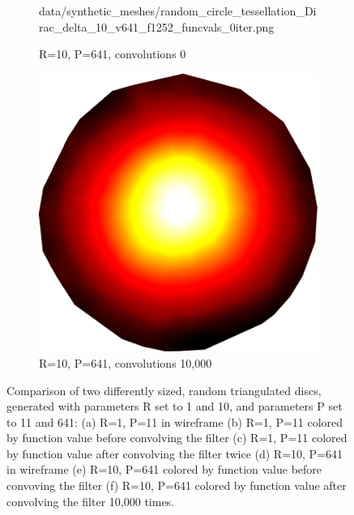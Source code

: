 \begin{figure}[ht]
\begin{subfigure}[b]{0.32\linewidth}
		{data/synthetic_meshes/random_circle_tessellation_Dirac_delta_10_v641_f1252_funcvals_0iter.png}
		\caption{R=10, P=641, convolutions 0}\label{fig:rcirc.d}
	\end{subfigure}
	\begin{subfigure}[b]{0.32\linewidth}
		\includegraphics[width=\linewidth]
		{data/synthetic_meshes/random_circle_tessellation_Dirac_delta_10_v641_f1252_funcvals_10000iter.png}
		\caption{R=10, P=641, convolutions 10,000}\label{fig:rcirc.f}
	\end{subfigure}
	\caption[Six views, comparing two differently sized, random triangulated discs]{Comparison of two differently sized, random triangulated discs, generated with parameters R set to 1 and 10, and parameters P set to 11 and 641: (a) R=1, P=11 in wireframe (b) R=1, P=11 colored by function value before convolving the filter (c) R=1, P=11 colored by function value after convolving the filter twice (d) R=10, P=641 in wireframe (e) R=10, P=641 colored by function value before convoving the filter (f) R=10, P=641 colored by function value after convolving the filter 10,000 times.}
	\label{fig:rdisc}
\end{figure}

